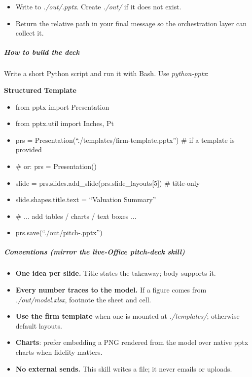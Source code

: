 \documentclass[11pt]{article}
\begin{document}
\begin{itemize}[leftmargin=*,itemsep=2pt,topsep=2pt]
\item {} Write to \emph{./out/.pptx}. Create \emph{./out/} if it does not exist.
\item {} Return the relative path in your final message so the orchestration layer can collect it.
\end{itemize}

\subparagraph{How to build the deck}\mbox{}\par

Write a short Python script and run it with Bash. Use \emph{python-pptx}:


\textbf{Structured Template}
\begin{itemize}[leftmargin=*,itemsep=2pt,topsep=2pt]
\item {} from pptx import Presentation
\item {} from pptx.util import Inches, Pt
\item {} prs = Presentation(``./templates/firm-template.pptx'') \# if a template is provided
\item {} \# or: prs = Presentation()
\item {} slide = prs.slides.add\_\allowbreak{}slide(prs.slide\_\allowbreak{}layouts[5]) \# title-only
\item {} slide.shapes.title.text = ``Valuation Summary''
\item {} \# ... add tables / charts / text boxes ...
\item {} prs.save(``./out/pitch-.pptx'')
\end{itemize}

\subparagraph{Conventions (mirror the live-Office \emph{pitch-deck} skill)}\mbox{}\par

\begin{itemize}[leftmargin=*,itemsep=2pt,topsep=2pt]
\item {} \textbf{One idea per slide.} Title states the takeaway; body supports it.
\item {} \textbf{Every number traces to the model.} If a figure comes from \emph{./out/model.xlsx}, footnote the sheet and cell.
\item {} \textbf{Use the firm template} when one is mounted at \emph{./templates/}; otherwise default layouts.
\item {} \textbf{Charts}: prefer embedding a PNG rendered from the model over native pptx charts when fidelity matters.
\item {} \textbf{No external sends.} This skill writes a file; it never emails or uploads.
\end{itemize}
\end{document}
